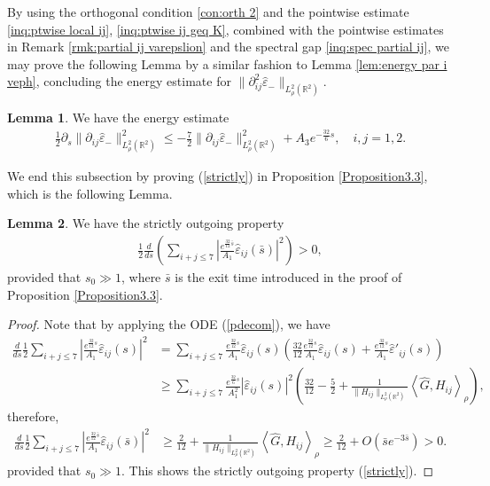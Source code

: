 \documentclass[11pt,reqno]{amsart}
\theoremstyle{definition}
\theoremstyle{bfremark}
\newtheorem{lemma}{Lemma}[section]
\numberwithin{equation}{section}
\newcommand{\veph}{\hat\varepsilon }
\begin{document}
By using the orthogonal condition \ref{con:orth 2} and the pointwise estimate \ref{inq:ptwise local ij}, \ref{inq:ptwise ij geq K}, combined with the pointwise estimates in Remark \ref{rmk:partial ij varepslion} and the spectral gap \ref{inq:spec partial ij}, we may prove the following Lemma by a similar fashion to Lemma \ref{lem:energy par i veph}, concluding the energy estimate for \(\|\partial^2_{ij}\veph_-\|_{L^2_{\rho}(\mathbb{R}^2)}\).
\begin{lemma}
\label{lem:energy par ij veph}
    We have the energy estimate
    \begin{align}
        \frac{1}{2}\partial_s\|\partial_{ij}\veph_-\|^2_{L^2_{\rho}(\mathbb{R}^2)} \leq -\frac{7}{2}\|\partial_{ij}\veph_-\|^2_{L^2_{\rho}(\mathbb{R}^2)}+A_3e^{-\frac{32}{6}s}, \quad i,j=1,2.\label{en7}
    \end{align}
\end{lemma}




We end this subsection by proving (\ref{strictly}) in Proposition \ref{Proposition3.3}, which is the following Lemma.

\begin{lemma}
\label{Lemma5.4}
    We have the strictly outgoing property 
    \begin{align*}
        \frac{1}{2}\frac{d}{ds}\left(\sum_{i+j \leq 7}\left|\frac{e^{\frac{32}{12}\bar s}}{A_1}\veph_{ij}(\bar{s})\right|^2\right)>0,
    \end{align*}
    provided that \(s_0 \gg 1\), where \(\bar{s}\) is the exit time introduced in the proof of Proposition \ref{Proposition3.3}.
\end{lemma}

\begin{proof}
    Note that by applying the ODE (\ref{pdecom}), we have 
    \begin{align*}
        \frac{d}{ds}\frac{1}{2}\sum_{i+j \leq 7}\left|\frac{e^{\frac{32}{12}s}}{A_1}\veph_{ij}(s)\right|^2&=\sum_{i+j \leq 7}\frac{e^{\frac{32}{12}s}}{A_1}\veph_{ij}(s)\left(\frac{32}{12}\frac{e^{\frac{32}{12}s}}{A_1}\veph_{ij}(s)+\frac{e^{\frac{32}{12}s}}{A_1}\veph'_{ij}(s)\right)\\
        & \geq \sum_{i+j \leq 7}\frac{e^{\frac{32}{6}s}}{A_1^2}|\veph_{ij
        }(s)|^2\left(\frac{32}{12}-\frac{5}{2}+\frac{1}{\|H_{ij}\|_{L^2_{\rho}(\mathbb{R}^2)}}\left<\hat{G},H_{ij}\right>_{\rho}\right),
    \end{align*}
    therefore,
    \begin{align*}
        \frac{d}{ds}\frac{1}{2}\sum_{i+j \leq 7}\left|\frac{e^{\frac{32}{12}\bar s}}{A_1}\veph_{ij}(\bar{s})\right|^2 &\geq \frac{2}{12}+\frac{1}{\|H_{ij}\|_{L^2_{\rho}(\mathbb{R}^2)}}\left<\hat{G},H_{ij}\right>_{\rho} \geq \frac{2}{12}+O(\bar{s}e^{-3\bar{s}})>0.
     \end{align*}
    provided that \(s_0 \gg 1\). This shows the strictly outgoing property (\ref{strictly}).
\end{proof}
\end{document}
